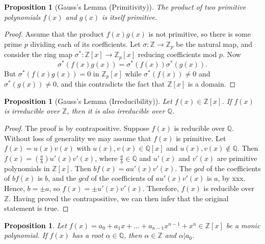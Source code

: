 \documentclass[draft]{article}
\newtheorem{prop}[thm]{Proposition}
\theoremstyle{definition}
\theoremstyle{remark}
\begin{document}
		    \begin{prop}[Gauss's Lemma (Primitivity)]
		        The product of two primitive polynomials $f(x)$ and $g(x)$ is itself primitive.
		    \end{prop}
		    
		    \begin{proof}
		        Assume that the product $f(x)g(x)$ is not primitive, so there is some prime $p$ dividing each of its coefficients. Let $\sigma: \mathbb{Z} \to \mathbb{Z}_p$ be the natural map, and consider the ring map $\sigma^{*}: \mathbb{Z}[x] \to \mathbb{Z}_p[x]$ reducing coefficients mod $p$. Now
		        \begin{equation*}
		            \sigma^{*}(f(x)g(x)) = \sigma^{*}(f(x))\sigma^{*}(g(x)).
		        \end{equation*}
		        But $\sigma^{*}(f(x)g(x)) = 0$ in $\mathbb{Z}_p[x]$ while $\sigma^{*}(f(x)) \neq 0$ and $\sigma^{*}(g(x)) \neq 0$, and this contradicts the fact that $\mathbb{Z}[x]$ is a domain.
		    \end{proof}
			
			\begin{prop}[Gauss's Lemma (Irreducibility)]
				Let $f(x) \in \mathbb{Z}[x]$. If $f(x)$ is irreducible over $\mathbb{Z}$, then it is also irreducible over $\mathbb{Q}$.
			\end{prop}
			
			\begin{proof}
				The proof is by contrapositive. Suppose $f(x)$ is reducible over $\mathbb{Q}$. Without loss of generality we may assume that $f(x)$ is primitive. Let $f(x) = u(x)v(x)$ with $u(x), v(x) \in \mathbb{Q}[x]$ and $u(x), v(x) \notin \mathbb{Q}$. Then $f(x) = (\frac{a}{b})u'(x)v'(x)$, where $\frac{a}{b} \in \mathbb{Q}$ and $u'(x)$ and $v'(x)$ are primitive polynomials in $\mathbb{Z}[x]$. Then $bf(x) = au'(x)v'(x)$. The $gcd$ of the coefficients of $bf(x)$ is $b$, and the $gcd$ of the coefficients of $au'(x)v'(x)$ is $a$, by xxx. Hence, $b = \pm a$, so $f(x) = \pm u'(x)v'(x)$. Therefore, $f(x)$ is reducible over $\mathbb{Z}$. Having proved the contrapositive, we can then infer that the original statement is true.
			\end{proof}
			
			\begin{prop}
				Let $f(x) = a_0 + a_1x + \dots + a_{n - 1}x^{n - 1} + x^n \in \mathbb{Z}[x]$ be a monic polynomial. If $f(x)$ has a root $\alpha \in \mathbb{Q}$, then $\alpha \in \mathbb{Z}$ and $\alpha | a_0$.
			\end{prop}
			
\end{document}
